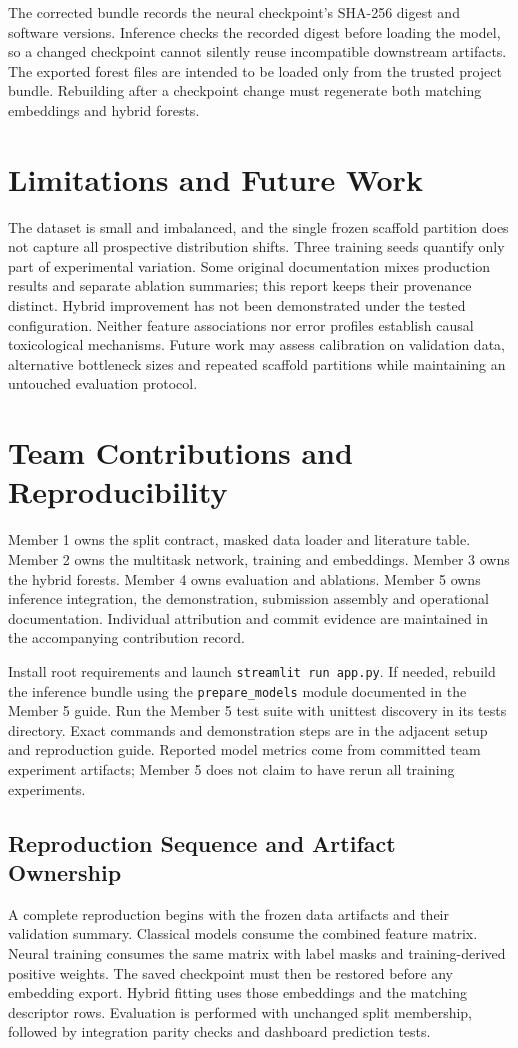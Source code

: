 \documentclass[11pt,a4paper]{article}\usepackage[margin=25mm]{geometry}\usepackage{fancyhdr}\usepackage{setspace}\usepackage{titlesec}\usepackage{xcolor}
\begin{document}
The corrected bundle records the neural checkpoint's SHA-256 digest and software versions. Inference checks the recorded digest before loading the model, so a changed checkpoint cannot silently reuse incompatible downstream artifacts. The exported forest files are intended to be loaded only from the trusted project bundle. Rebuilding after a checkpoint change must regenerate both matching embeddings and hybrid forests.


\section{Limitations and Future Work}
The dataset is small and imbalanced, and the single frozen scaffold partition does not capture all prospective distribution shifts. Three training seeds quantify only part of experimental variation. Some original documentation mixes production results and separate ablation summaries; this report keeps their provenance distinct. Hybrid improvement has not been demonstrated under the tested configuration. Neither feature associations nor error profiles establish causal toxicological mechanisms. Future work may assess calibration on validation data, alternative bottleneck sizes and repeated scaffold partitions while maintaining an untouched evaluation protocol.

\section{Team Contributions and Reproducibility}
Member 1 owns the split contract, masked data loader and literature table. Member 2 owns the multitask network, training and embeddings. Member 3 owns the hybrid forests. Member 4 owns evaluation and ablations. Member 5 owns inference integration, the demonstration, submission assembly and operational documentation. Individual attribution and commit evidence are maintained in the accompanying contribution record.

Install root requirements and launch \texttt{streamlit run app.py}. If needed, rebuild the inference bundle using the \texttt{prepare\_models} module documented in the Member 5 guide. Run the Member 5 test suite with unittest discovery in its tests directory. Exact commands and demonstration steps are in the adjacent setup and reproduction guide. Reported model metrics come from committed team experiment artifacts; Member 5 does not claim to have rerun all training experiments.


\subsection{Reproduction Sequence and Artifact Ownership}
A complete reproduction begins with the frozen data artifacts and their validation summary. Classical models consume the combined feature matrix. Neural training consumes the same matrix with label masks and training-derived positive weights. The saved checkpoint must then be restored before any embedding export. Hybrid fitting uses those embeddings and the matching descriptor rows. Evaluation is performed with unchanged split membership, followed by integration parity checks and dashboard prediction tests.
\end{document}
